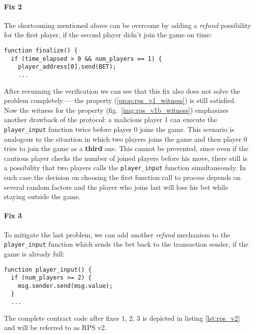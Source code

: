 \documentclass{article}
\begin{document}
\paragraph{Fix 2}

The shortcoming mentioned above can be overcome by adding a \emph{refund} possibility for the first player, if the second player
didn't join the game on time:
\begin{lstlisting}
function finalize() {
  if (time_elapsed > 0 && num_players == 1) {
    player_address[0].send(BET);
    ...
\end{lstlisting}

After rerunning the verification we can see that this fix also does not solve the problem completely --- the property 
(\ref{prop:rps_v1_witness}) is still satisfied.
Now the witness for the property (fig.\ \ref{img:rps_v1b_witness}) emphasizes another drawback of the protocol:
a malicious player 1 can execute the \lstinline{player_input} function twice before player 0 joins the game.
This scenario is analogous to the situation in which two players joins the game and then player 0 tries to join
the game as a \textbf{third} one.
This cannot be prevented, since even if the cautious player checks the number of joined players before his move,
there still is a possibility that two players calls the \lstinline{player_input} function simultaneously.
In such case the decision on choosing the first function call to process depends on several random factors and the player
who joins last will lose his bet while staying outside the game.

\paragraph{Fix 3}

To mitigate the last problem, we can add another \emph{refund} mechanism to the \lstinline{player_input} function
which sends the bet back to the transaction sender, if the game is already full:
\begin{lstlisting}
function player_input() {
  if (num_players >= 2) {
    msg.sender.send(msg.value);
  }
  ...
\end{lstlisting}

The complete contract code after fixes 1, 2, 3 is depicted in listing \ref{lst:rps_v2} and will be referred to as RPS v2.

  
\end{document}
